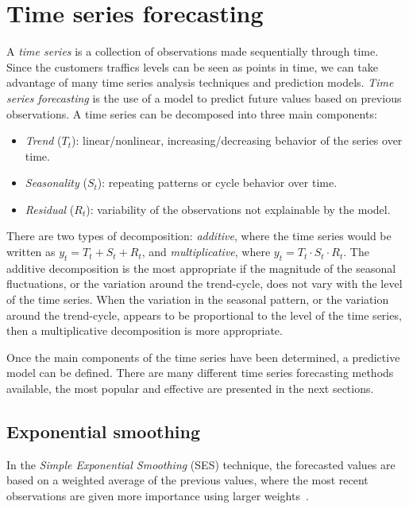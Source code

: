 \section{Time series forecasting}
\label{sec:time_series_forecasting}

A \emph{time series} is a collection of observations made sequentially through time. Since the customers traffics levels can be seen as points in time, we can take advantage of many time series analysis techniques and prediction models. \emph{Time series forecasting} is the use of a model to predict future values based on previous observations. A time series can be decomposed into three main components:
\begin{itemize}
  \item \emph{Trend} (\( T_t \)): linear/nonlinear, increasing/decreasing behavior of the series over time.
  \item \emph{Seasonality} (\( S_t \)): repeating patterns or cycle behavior over time.
  \item \emph{Residual} (\( R_t \)): variability of the observations not explainable by the model.
\end{itemize}

There are two types of decomposition: \emph{additive}, where the time series would be written as \( y_t = T_t + S_t + R_t \), and \emph{multiplicative}, where \( y_t = T_t \cdot S_t \cdot R_t \). The additive decomposition is the most appropriate if the magnitude of the seasonal fluctuations, or the variation around the trend-cycle, does not vary with the level of the time series. When the variation in the seasonal pattern, or the variation around the trend-cycle, appears to be proportional to the level of the time series, then a multiplicative decomposition is more appropriate.

Once the main components of the time series have been determined, a predictive model can be defined. There are many different time series forecasting methods available, the most popular and effective are presented in the next sections.

\subsection{Exponential smoothing}
\label{subsec:exponential_smoothing}

In the \emph{Simple Exponential Smoothing} (SES) technique, the forecasted values are based on a weighted average of the previous values, where the most recent observations are given more importance using larger weights~\cite{brown}.

